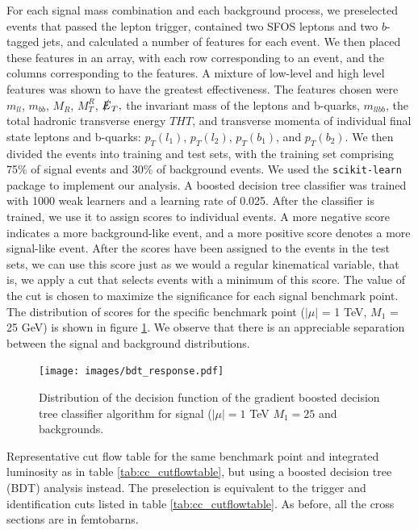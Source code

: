 For each signal mass combination and each background process, we preselected events that passed the lepton trigger, contained two SFOS leptons and two $b$-tagged jets, and calculated a number of features for each event. We then placed these features in an array, with each row corresponding to an event, and the columns corresponding to the features. A mixture of low-level and high level features was shown to have the greatest effectiveness. The features chosen were $m_{ll}$, $m_{bb}$, $M_R$, $M_T^R$, $\slashed{E}_T,$ the invariant mass of the leptons and b-quarks, $m_{llbb}$, the total hadronic transverse energy $THT$, and transverse momenta of individual final state leptons and b-quarks: $p_T(l_1)$, $p_T(l_2)$, $p_T(b_1)$, and $p_T(b_2)$. We then divided the events into training and test sets, with the training set comprising 75\% of signal events and 30\% of background events. We used the \texttt{scikit-learn} package  \citep{Pedregosa2011} to implement our analysis. A boosted decision tree classifier was trained with 1000 weak learners and a learning rate of 0.025. After the classifier is trained, we use it to assign scores to individual events. A more negative score indicates a more background-like event, and a more positive score denotes a more signal-like event. After the scores have been assigned to the events in the test sets, we can use this score just as we would a regular kinematical variable, that is, we apply a cut that selects events with a minimum of this score. The value of the cut is chosen to maximize the significance for each signal benchmark point. The distribution of scores for the specific benchmark point ($|\mu|$ = 1 TeV, $M_1$ = 25 GeV) is shown in figure \ref{fig:bdt_response}. We observe that there is an appreciable separation between the signal and background distributions.

\begin{figure}[h]
\centering
\texttt{[image: images/bdt\_response.pdf]}
\caption{Distribution of the decision function of the gradient boosted decision tree classifier algorithm for signal ($|\mu| = 1$ TeV $M_1 = 25$ and backgrounds. }
\label{fig:bdt_response}
\end{figure}

\begin{table}[h]
  \centering
  
  \caption{Representative cut flow table for the same benchmark point and integrated luminosity as in table \ref{tab:cc_cutflowtable}, but using a boosted decision tree (BDT) analysis instead. The preselection is equivalent to the trigger and identification cuts listed in table \ref{tab:cc_cutflowtable}. As before, all the cross sections are in femtobarns.}
\label{tab:bdt_cutflowtable}
\end{table}

